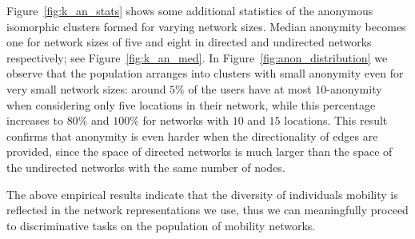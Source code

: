  Figure~\ref{fig:k_an_stats} shows some additional statistics of the anonymous isomorphic clusters formed for varying network sizes.
 Median anonymity becomes one for network sizes of five and eight in directed and undirected networks respectively; see Figure~\ref{fig:k_an_med}.
 In Figure~\ref{fig:anon_distribution} we observe that the population arranges into clusters with small anonymity even for very small network sizes: around $5\%$  of the users have at most $10$-anonymity when considering only five locations in their network, while this percentage increases to $80\%$ and $100\% $ for networks with $10$ and $15$ locations.
 This result confirms that anonymity is even harder when the directionality of edges are provided, since the space of directed networks is much larger than the space of the undirected networks with the same number of nodes.

 The above empirical results indicate that the diversity of individuals mobility is reflected in the network representations we use, thus we can meaningfully proceed to discriminative tasks on the population of mobility networks.

